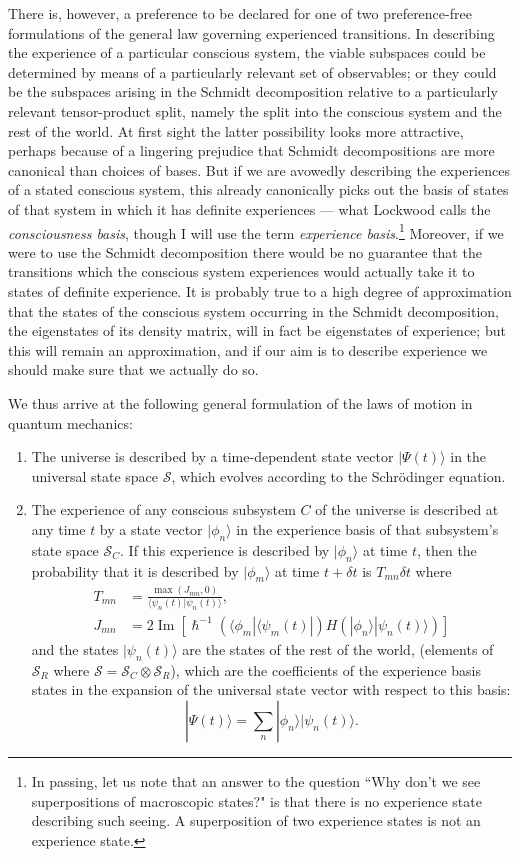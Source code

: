 \documentclass[12pt,a4paper,reqno]{article}
\renewcommand{\(}{\left(}
\renewcommand{\)}{\right)}
\renewcommand{\hbar}{\hslash}
\renewcommand{\S}{\mathcal{S}}
\newcommand{\ox}{\otimes}
\newcommand{\<}{\langle}
\renewcommand{\>}{\rangle}
\renewcommand{\Im}{\operatorname{Im}}
\theoremstyle{plain} %
\theoremstyle{definition}
\theoremstyle{remark}
\begin{document}
There is, however, a preference to be declared for one of two
preference-free formulations of the general law governing experienced
transitions. In describing the experience of a particular conscious
system, the viable subspaces could be determined by means of a
particularly relevant set of observables; or they could be the subspaces
arising in the Schmidt decomposition relative to a particularly relevant
tensor-product split, namely the split into the conscious system and the
rest of the world. At first sight the latter possibility looks more
attractive, perhaps because of a lingering prejudice that Schmidt
decompositions are more canonical than choices of bases. But if we
are avowedly describing the experiences of a stated conscious system,
this already canonically picks out the basis of states of that system in
which it has definite experiences --- what Lockwood \cite{Lockwood:manyminds}
calls the \emph{consciousness basis}, though I will use the term
\emph{experience basis}.\footnote{In passing, let us note that an answer to the
question ``Why don't we see superpositions of macroscopic states?" is
that there is no experience state describing such seeing. A
superposition of two experience states is not an experience
state.} Moreover, if we were to use the Schmidt decomposition there
would be no guarantee that the transitions which the conscious system
experiences would actually take it to states of definite experience. It
is probably true to a high degree of approximation that the states of
the conscious system occurring in the Schmidt decomposition, the
eigenstates of its density matrix, will in fact be eigenstates of
experience; but this will remain an approximation, and if our aim is to
describe experience we should make sure that we actually do so.


We thus arrive at the following general formulation of the laws of
motion in quantum mechanics:

\begin{enumerate}
\item The universe is described by a time-dependent state vector 
$|\Psi(t)\>$ in the universal state space $\S$,
which evolves according to the Schr\"odinger equation. 
\item The experience of any conscious subsystem $C$ of the universe is 
described at any time $t$ by a state vector $|\phi_n\>$ in the experience basis
of that subsystem's state space $\S_C$. If this experience is described by
$|\phi_n\>$ at time $t$, then the probability that it is described by
$|\phi_m\>$ at time $t+\delta t$ is $T_{mn}\delta t$ where
\begin{align}
T_{mn} &= \frac{\max(J_{mn},0)}{\<\psi_n(t)|\psi_n(t)\>},\\
J_{mn} &= 
2\Im\left[\hbar^{-1}\(\<\phi_m|\<\psi_m(t)|\)H\(|\phi_n\>|\psi_n(t)\>\)\right] 
\end{align}
and the states $|\psi_n(t)\>$ are the states of the rest of the world,
(elements of $\S_R$ where $\S = \S_C\ox\S_R$),
which are the coefficients of the experience basis states in the
expansion of the universal state vector with respect to this basis:
\[
|\Psi(t)\> = \sum_n|\phi_n\>|\psi_n(t)\>.
\]
\end{enumerate}
\end{document}
